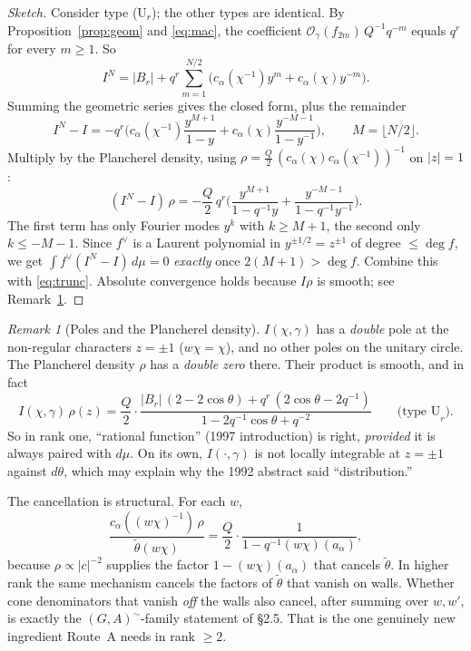 \documentclass[11pt]{article}
\theoremstyle{remark}
\newtheorem{remark}[proposition]{Remark}
\newcommand{\OO}{\mathcal{O}}
\begin{document}
\begin{proof}[Sketch]
Consider type (U$_r$); the other types are identical. By Proposition~\ref{prop:geom} and \eqref{eq:mac}, the coefficient $\OO_\gamma(f_{2m})\,Q^{-1}q^{-m}$ equals $q^r$ for every $m\ge1$. So
\[
I^N=|B_r|+q^r\sum_{m=1}^{N/2}\big(c_\alpha(\chi^{-1})y^m+c_\alpha(\chi)y^{-m}\big).
\]
Summing the geometric series gives the closed form, plus the remainder
\[
I^N-I=-q^r\Big(c_\alpha(\chi^{-1})\frac{y^{M+1}}{1-y}+c_\alpha(\chi)\frac{y^{-M-1}}{1-y^{-1}}\Big),\qquad M=\lfloor N/2\rfloor.
\]
Multiply by the Plancherel density, using $\rho=\frac Q2\,(c_\alpha(\chi)c_\alpha(\chi^{-1}))^{-1}$ on $|z|=1$:
\[
(I^N-I)\,\rho=-\frac{Q}{2}\,q^{r}\Big(\frac{y^{M+1}}{1-q^{-1}y}+\frac{y^{-M-1}}{1-q^{-1}y^{-1}}\Big).
\]
The first term has only Fourier modes $y^k$ with $k\ge M+1$, the second only $k\le-M-1$. Since $f^\vee$ is a Laurent polynomial in $y^{\pm1/2}=z^{\pm1}$ of degree $\le\deg f$, we get $\int f^\vee(I^N-I)\,d\mu=0$ \emph{exactly} once $2(M+1)>\deg f$. Combine this with \eqref{eq:trunc}. Absolute convergence holds because $I\rho$ is smooth; see Remark~\ref{rem:poles}.
\end{proof}

\begin{remark}[Poles and the Plancherel density]\label{rem:poles}
$I(\chi,\gamma)$ has a \emph{double} pole at the non-regular characters $z=\pm1$ ($w\chi=\chi$), and no other poles on the unitary circle. The Plancherel density $\rho$ has a \emph{double zero} there. Their product is smooth, and in fact
\[
I(\chi,\gamma)\,\rho(z)=\frac{Q}{2}\cdot\frac{|B_r|\,(2-2\cos\theta)+q^r\,(2\cos\theta-2q^{-1})}{1-2q^{-1}\cos\theta+q^{-2}}\qquad\text{(type U}_r).
\]
So in rank one, ``rational function'' (1997 introduction) is right, \emph{provided} it is always paired with $d\mu$. On its own, $I(\cdot,\gamma)$ is not locally integrable at $z=\pm1$ against $d\theta$, which may explain why the 1992 abstract said ``distribution.''

The cancellation is structural. For each $w$,
\[
\frac{c_\alpha((w\chi)^{-1})\,\rho}{\tilde\theta(w\chi)}=\frac{Q}{2}\cdot\frac{1}{1-q^{-1}(w\chi)(a_\alpha)},
\]
because $\rho\propto|c|^{-2}$ supplies the factor $1-(w\chi)(a_\alpha)$ that cancels $\tilde\theta$. In higher rank the same mechanism cancels the factors of $\tilde\theta$ that vanish on walls. Whether cone denominators that vanish \emph{off} the walls also cancel, after summing over $w,w'$, is exactly the $(G,A)^\sim$-family statement of \S2.5. That is the one genuinely new ingredient Route~A needs in rank $\ge2$.
\end{remark}
\end{document}
